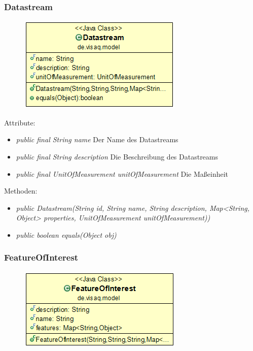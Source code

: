 \subsubsection {Datastream}
\begin{minipage}{0.3\textwidth}
	\begin{figure}[H]
		\includegraphics[scale = 0.5
		]{media/frontend/model/Datastream_Class.png}
	\end{figure}
\end{minipage} \hfill
\begin{minipage}{0.6\textwidth}
\end{minipage}

Attribute:
\begin{itemize} 
	\item \emph{public final String name} Der Name des Datastreams
	\item \emph{public final String description} Die Beschreibung des Datastreams
	\item \emph{public final UnitOfMeasurement unitOfMeasurement} Die Maßeinheit
\end{itemize}
Methoden:
\begin{itemize} 
	\item \emph{public Datastream(String id, String name, String description, Map<String, Object> properties, UnitOfMeasurement unitOfMeasurement))} 
	\item \emph{public boolean equals(Object obj)} 
\end{itemize}


\subsubsection {FeatureOfInterest}
\begin{minipage}{0.3\textwidth}
	\begin{figure}[H]
		\includegraphics[scale = 0.5
		]{media/frontend/model/FeatureOfInterest_Class.png}
	\end{figure}
\end{minipage} \hfill
\begin{minipage}{0.6\textwidth}
\end{minipage}

